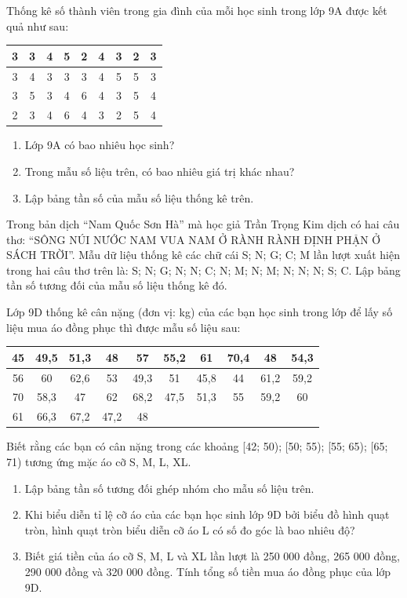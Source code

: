 \documentclass[%
    fontsize=12pt,%
    chapterprefix=false,%
    open=right,%
    twoside=false,%
    numbers=noenddot,%
    headings=optiontohead,%
    final,%
    DIV=15,%
    parskip=half %
]{scrbook}
\begin{document}
\begin{tuluan}
\item Thống kê số thành viên trong gia đình của mỗi học sinh trong lớp 9A được kết quả như sau: \begin{tabular}{|c|c|c|c|c|c|c|c|c|} \hline 3 & 3 & 4 & 5 & 2 & 4 & 3 & 2 & 3 \\ \hline 3 & 4 & 3 & 3 & 3 & 4 & 5 & 5 & 3 \\ \hline 3 & 5 & 3 & 4 & 6 & 4 & 3 & 5 & 4 \\ \hline 2 & 3 & 4 & 6 & 4 & 3 & 2 & 5 & 4 \\ \hline \end{tabular}
\begin{enumerate}[label=\alph*)]
  \item[a)] Lớp 9A có bao nhiêu học sinh?
  \item[b)] Trong mẫu số liệu trên, có bao nhiêu giá trị khác nhau?
  \item[c)] Lập bảng tần số của mẫu số liệu thống kê trên.
\end{enumerate}

\item Trong bản dịch ``Nam Quốc Sơn Hà'' mà học giả Trần Trọng Kim dịch có hai câu thơ: ``SÔNG NÚI NƯỚC NAM VUA NAM Ở RÀNH RÀNH ĐỊNH PHẬN Ở SÁCH TRỜI''. Mẫu dữ liệu thống kê các chữ cái S; N; G; C; M lần lượt xuất hiện trong hai câu thơ trên là: S; N; G; N; N; C; N; M; N; M; N; N; N; S; C. Lập bảng tần số tương đối của mẫu số liệu thống kê đó.

\item Lớp 9D thống kê cân nặng (đơn vị: kg) của các bạn học sinh trong lớp để lấy số liệu mua áo đồng phục thì được mẫu số liệu sau: \begin{tabular}{|c|c|c|c|c|c|c|c|c|c|} \hline 45 & 49,5 & 51,3 & 48 & 57 & 55,2 & 61 & 70,4 & 48 & 54,3 \\ \hline 56 & 60 & 62,6 & 53 & 49,3 & 51 & 45,8 & 44 & 61,2 & 59,2 \\ \hline 70 & 58,3 & 47 & 62 & 68,2 & 47,5 & 51,3 & 55 & 59,2 & 60 \\ \hline 61 & 66,3 & 67,2 & 47,2 & 48 & & & & & \\ \hline \end{tabular} Biết rằng các bạn có cân nặng trong các khoảng [42; 50); [50; 55); [55; 65); [65; 71) tương ứng mặc áo cỡ S, M, L, XL.
\begin{enumerate}[label=\alph*)]
  \item[a)] Lập bảng tần số tương đối ghép nhóm cho mẫu số liệu trên.
  \item[b)] Khi biểu diễn tỉ lệ cỡ áo của các bạn học sinh lớp 9D bởi biểu đồ hình quạt tròn, hình quạt tròn biểu diễn cỡ áo L có số đo góc là bao nhiêu độ?
  \item[c)] Biết giá tiền của áo cỡ S, M, L và XL lần lượt là 250 000 đồng, 265 000 đồng, 290 000 đồng và 320 000 đồng. Tính tổng số tiền mua áo đồng phục của lớp 9D.
\end{enumerate}

\end{tuluan}
\end{document}
